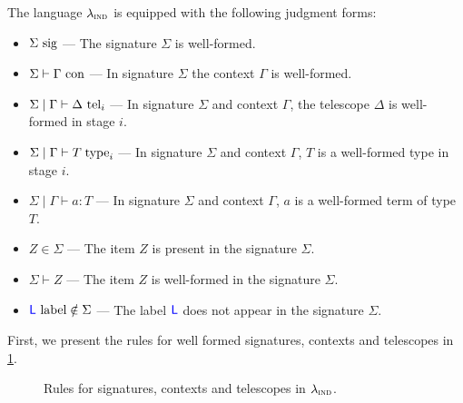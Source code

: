 The language $\lambdaind$ is equipped with the following judgment forms:
\begin{itemize}
  \item $\isSig{\Sigma}$ --- The signature $\Sigma$ is well-formed.
  \item $\Sigma \vdash \isCon{\Gamma}$ --- In signature $\Sigma$ the context $\Gamma$ is well-formed.
  \item $\Sigma \mid \Gamma \vdash \isTel{i}{\Delta}$ --- In signature $\Sigma$ and context
        $\Gamma$, the telescope $\Delta$ is well-formed in stage $i$.
  \item $\Sigma \mid \Gamma \vdash \istype{i}{T}$ --- In signature $\Sigma$ and
        context $\Gamma$, $T$ is a well-formed type in stage $i$.
  \item $\Sigma \mid \Gamma \vdash a : T$ --- In signature $\Sigma$ and context
        $\Gamma$, $a$ is a well-formed term of type $T$.
  \item $Z \in \Sigma$ --- The item $Z$ is present in the signature $\Sigma$.
  \item $\Sigma \vdash Z$ --- The item $Z$ is well-formed in the signature $\Sigma$.
  \item $\isLabNotIn{L}{\Sigma}$ --- The label $\lab{L}$ does not appear in the
        signature $\Sigma$.
\end{itemize}
First, we present the rules for well formed signatures, contexts and telescopes in \cref{fig:lambdaind-sig-rules}.

\begin{figure}[h]
  \caption{Rules for signatures, contexts and telescopes in $\lambdaind$.}
  \label{fig:lambdaind-sig-rules}
\end{figure}

